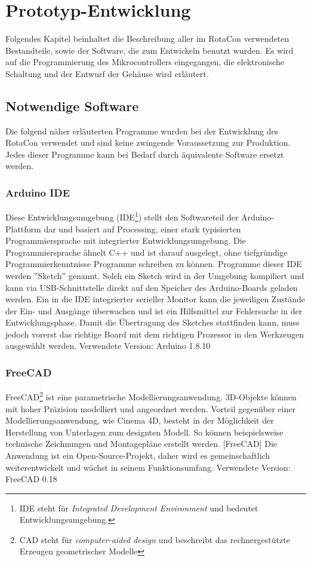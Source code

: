 \documentclass[11pt, titlepage]{report}
\begin{document}
	\chapter{Prototyp-Entwicklung}
	\label{sec:Praxistil}
		Folgendes Kapitel beinhaltet die Beschreibung aller im RotaCon verwendeten Bestandteile, sowie der Software, die zum Entwickeln benutzt wurden.
		Es wird auf die Programmierung des Mikrocontrollers eingegangen, die elektronische Schaltung und der Entwurf der Gehäuse wird erläutert.
		\section{Notwendige Software}
			Die folgend näher erläuterten Programme wurden bei der Entwicklung des RotaCon verwendet und sind keine zwingende Voraussetzung zur Produktion. Jedes dieser Programme kann bei Bedarf durch äquivalente Software ersetzt werden. 
			\subsection*{Arduino IDE}
			\label{sec:Arduino IDE}
				Diese Entwicklungsumgebung (IDE\footnote{IDE steht für \textit{Integrated Development Environment} und bedeutet Entwicklungsumgebung.}) stellt den Softwareteil der Arduino-Plattform dar und basiert auf Processing, einer stark typisierten Programmiersprache mit integrierter Entwicklungsumgebung. Die Programmiersprache ähnelt C++ und ist darauf ausgelegt, ohne tiefgründige Programmierkenntnisse Programme schreiben zu können. Programme dieser IDE werden ''Sketch'' genannt. \newline Solch ein Sketch wird in der Umgebung kompiliert und kann via USB-Schnittstelle direkt auf den Speicher des Arduino-Boards geladen werden. Ein in die IDE integrierter serieller Monitor kann die jeweiligen Zustände der Ein- und Ausgänge überwachen und ist ein Hilfsmittel zur Fehlersuche in der Entwicklungsphase.
				\newline Damit die Übertragung des Sketches stattfinden kann, muss jedoch vorerst das richtige Board mit dem richtigen Prozessor in den Werkzeugen ausgewählt werden. Verwendete Version: Arduino 1.8.10
			\subsection*{FreeCAD}
			\label{sec:FreeCAD}
				FreeCAD\footnote{CAD steht für \textit{computer-aided design} und beschreibt das rechnergestützte Erzeugen geometrischer Modelle} ist eine parametrische Modellierungsanwendung. 3D-Objekte können mit hoher Präzision modelliert und angeordnet werden. Vorteil gegenüber einer Modellierungsanwendung, wie Cinema 4D, besteht in der Möglichkeit der Herstellung von Unterlagen zum designten Modell. So können beispielsweise technische Zeichnungen und Montagepläne erstellt werden. [FreeCAD\cite{FreeCAD}] 
				\newline Die Anwendung ist ein Open-Source-Projekt, daher wird es gemeinschaftlich weiterentwickelt und wächst in seinem Funktionsumfang. Verwendete Version: FreeCAD 0.18
			\newpage	
\end{document}
